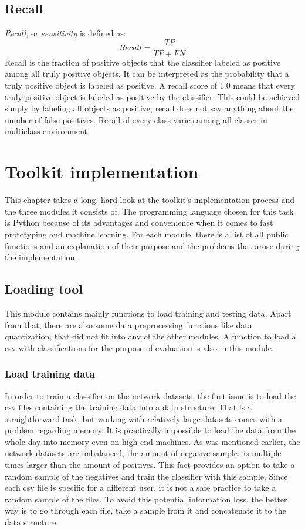 \documentclass{article}
\begin{document}
    \subsection{Recall}
      {\it Recall}, or {\it sensitivity} is defined as:
      \begin{displaymath}
        Recall = \frac{TP}{TP + FN}
      \end{displaymath}
      Recall is the fraction of positive objects that the classifier labeled as positive among all truly positive objects. It can be interpreted as the probability that a truly positive object is labeled as positive. A recall score of 1.0 means that every truly positive object is labeled as positive by the classifier. This could be achieved simply by labeling all objects as positive, recall does not say anything about the number of false positives. Recall of every class varies among all classes in multiclass environment.
  \newpage
  \section{Toolkit implementation}
      This chapter takes a long, hard look at the toolkit's implementation process and the three modules it consists of. The programming language chosen for this task is Python because of its advantages and convenience when it comes to fast prototyping and machine learning. For each module, there is a list of all public functions and an explanation of their purpose and the problems that arose during the implementation.
    \subsection{Loading tool}
      This module contains mainly functions to load training and testing data. Apart from that, there are also some data preprocessing functions like data quantization, that did not fit into any of the other modules. A function to load a csv with classifications for the purpose of evaluation is also in this module.
      \subsubsection{Load training data}
        In order to train a classifier on the network datasets, the first issue is to load the csv files containing the training data into a data structure. That is a straightforward task, but working with relatively large datasets comes with a problem regarding memory. It is practically impossible to load the data from the whole day into memory even on high-end machines. As was mentioned earlier, the network datasets are imbalanced, the amount of negative samples is multiple times larger than the amount of positives. This fact provides an option to take a random sample of the negatives and train the classifier with this sample. Since each csv file is specific for a different user, it is not a safe practice to take a random sample of the files. To avoid this potential information loss, the better way is to go through each file, take a sample from it and concatenate it to the data structure.
\end{document}
